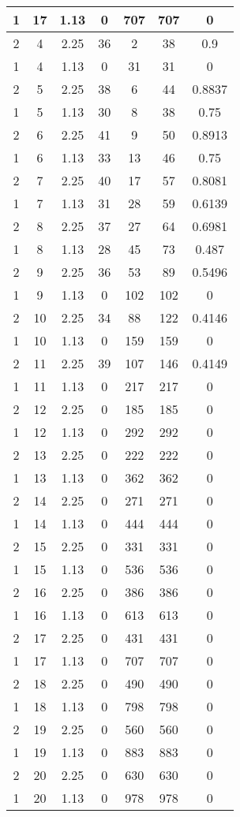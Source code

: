 \documentclass[letterpaper, 12pt]{article}
\begin{document}
\begin{longtable}{|c|c|c|c|c|c|c|}
\hline
1 & 17 & 1.13 & 0 & 707 & 707 & 0 \\
\hline
2 & 4 & 2.25 & 36 & 2 & 38 & 0.9 \\
\hline
1 & 4 & 1.13 & 0 & 31 & 31 & 0 \\
\hline
2 & 5 & 2.25 & 38 & 6 & 44 & 0.8837 \\
\hline
1 & 5 & 1.13 & 30 & 8 & 38 & 0.75 \\
\hline
2 & 6 & 2.25 & 41 & 9 & 50 & 0.8913 \\
\hline
1 & 6 & 1.13 & 33 & 13 & 46 & 0.75 \\
\hline
2 & 7 & 2.25 & 40 & 17 & 57 & 0.8081 \\
\hline
1 & 7 & 1.13 & 31 & 28 & 59 & 0.6139 \\
\hline
2 & 8 & 2.25 & 37 & 27 & 64 & 0.6981 \\
\hline
1 & 8 & 1.13 & 28 & 45 & 73 & 0.487 \\
\hline
2 & 9 & 2.25 & 36 & 53 & 89 & 0.5496 \\
\hline
1 & 9 & 1.13 & 0 & 102 & 102 & 0 \\
\hline
2 & 10 & 2.25 & 34 & 88 & 122 & 0.4146 \\
\hline
1 & 10 & 1.13 & 0 & 159 & 159 & 0 \\
\hline
2 & 11 & 2.25 & 39 & 107 & 146 & 0.4149 \\
\hline
1 & 11 & 1.13 & 0 & 217 & 217 & 0 \\
\hline
2 & 12 & 2.25 & 0 & 185 & 185 & 0 \\
\hline
1 & 12 & 1.13 & 0 & 292 & 292 & 0 \\
\hline
2 & 13 & 2.25 & 0 & 222 & 222 & 0 \\
\hline
1 & 13 & 1.13 & 0 & 362 & 362 & 0 \\
\hline
2 & 14 & 2.25 & 0 & 271 & 271 & 0 \\
\hline
1 & 14 & 1.13 & 0 & 444 & 444 & 0 \\
\hline
2 & 15 & 2.25 & 0 & 331 & 331 & 0 \\
\hline
1 & 15 & 1.13 & 0 & 536 & 536 & 0 \\
\hline
2 & 16 & 2.25 & 0 & 386 & 386 & 0 \\
\hline
1 & 16 & 1.13 & 0 & 613 & 613 & 0 \\
\hline
2 & 17 & 2.25 & 0 & 431 & 431 & 0 \\
\hline
1 & 17 & 1.13 & 0 & 707 & 707 & 0 \\
\hline
2 & 18 & 2.25 & 0 & 490 & 490 & 0 \\
\hline
1 & 18 & 1.13 & 0 & 798 & 798 & 0 \\
\hline
2 & 19 & 2.25 & 0 & 560 & 560 & 0 \\
\hline
1 & 19 & 1.13 & 0 & 883 & 883 & 0 \\
\hline
2 & 20 & 2.25 & 0 & 630 & 630 & 0 \\
\hline
1 & 20 & 1.13 & 0 & 978 & 978 & 0 \\
\hline
\end{longtable}
\end{document}
